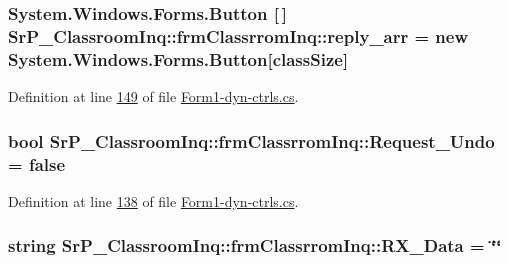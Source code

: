 \hypertarget{class_sr_p___classroom_inq_1_1frm_classrrom_inq_a46ee30d934a5219840e4381a66728f0f}{
\subsubsection[{reply\-\_\-arr}]{\setlength{\rightskip}{0pt plus 5cm}\-System.\-Windows.\-Forms.\-Button \mbox{[}$\,$\mbox{]} {\bf \-Sr\-P\-\_\-\-Classroom\-Inq\-::frm\-Classrrom\-Inq\-::reply\-\_\-arr} = new \-System.\-Windows.\-Forms.\-Button\mbox{[}{\bf class\-Size}\mbox{]}}}
\label{class_sr_p___classroom_inq_1_1frm_classrrom_inq_a46ee30d934a5219840e4381a66728f0f}


\-Definition at line \hyperlink{_form1-dyn-ctrls_8cs_source_l00149}{149} of file \hyperlink{_form1-dyn-ctrls_8cs_source}{\-Form1-\/dyn-\/ctrls.\-cs}.

\hypertarget{class_sr_p___classroom_inq_1_1frm_classrrom_inq_acb5bab8dcbcbfc8ed7a5b260ddba84e3}{
\subsubsection[{\-Request\-\_\-\-Undo}]{\setlength{\rightskip}{0pt plus 5cm}bool {\bf \-Sr\-P\-\_\-\-Classroom\-Inq\-::frm\-Classrrom\-Inq\-::\-Request\-\_\-\-Undo} = false}}
\label{class_sr_p___classroom_inq_1_1frm_classrrom_inq_acb5bab8dcbcbfc8ed7a5b260ddba84e3}


\-Definition at line \hyperlink{_form1-dyn-ctrls_8cs_source_l00138}{138} of file \hyperlink{_form1-dyn-ctrls_8cs_source}{\-Form1-\/dyn-\/ctrls.\-cs}.

\hypertarget{class_sr_p___classroom_inq_1_1frm_classrrom_inq_ab11c567168df8023b691c4adf4a149ad}{
\subsubsection[{\-R\-X\-\_\-\-Data}]{\setlength{\rightskip}{0pt plus 5cm}string {\bf \-Sr\-P\-\_\-\-Classroom\-Inq\-::frm\-Classrrom\-Inq\-::\-R\-X\-\_\-\-Data} = \char`\"{}\char`\"{}}}
\label{class_sr_p___classroom_inq_1_1frm_classrrom_inq_ab11c567168df8023b691c4adf4a149ad}


